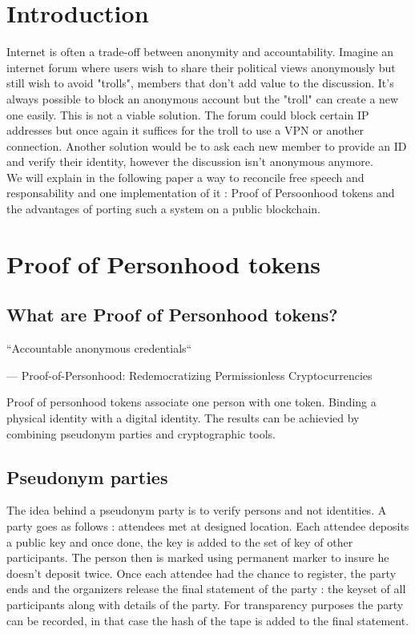 \documentclass[11pt, a4paper, twoside, openright]{book} %
\begin{document}

\tableofcontents



\newpage
\section{Introduction}
Internet is often a	trade-off between anonymity and accountability. Imagine an internet forum where users wish to share their political views anonymously but still wish to avoid "trolls", members that don't add value to the discussion. It's always possible to block an anonymous account but the "troll" can create a new one easily. This is not a viable solution. The forum could block certain IP addresses but once again it suffices for the troll to use a VPN or another connection. Another solution would be to ask each new member to provide an ID and verify their identity, however the discussion isn't anonymous anymore. \\
We will explain in the following paper a way to reconcile free speech and responsability and one implementation of it : Proof of Persoonhood tokens and the advantages of porting such a system on a public blockchain.



\section{Proof of Personhood tokens}
\subsection{What are Proof of Personhood tokens?}

\epigraph{``Accountable anonymous credentials``}
{--- \textup{Proof-of-Personhood: Redemocratizing Permissionless Cryptocurrencies}}

Proof of personhood tokens associate one person with one token. Binding a physical identity with a digital identity. The results can be achievied by combining pseudonym parties and cryptographic tools.

\subsection{Pseudonym parties}

The idea behind a pseudonym party is to verify persons and not identities. A party goes as follows :  attendees met at designed location. Each attendee deposits a public key and once done, the key is added to the set of key of other participants. The person then is marked using permanent marker to insure he doesn't deposit twice. Once each attendee had the chance to register, the party ends and the organizers release the final statement of the party : the keyset of all participants along with details of the party. For transparency purposes the party can be recorded, in that case the hash of the tape is added to the final statement.
\end{document}
